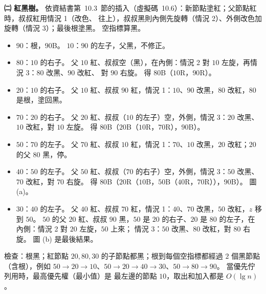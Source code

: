 \begin{pastsoln}
\textbf{㈡ 紅黑樹。} 依資結書第~10.3~節的插入（虛擬碼~10.6）：新節點塗紅；父節點紅時，叔叔紅用情況 1（改色、
往上），叔叔黑則內側先旋轉（情況 2）、外側改色加旋轉（情況 3）；最後根塗黑。 空指標算黑。
\begin{itemize}
\item $90$：根，$90$B。 $10$：$90$ 的左子，父黑，不修正。
\item $80$：$10$ 的右子。 父 $10$ 紅、叔叔空（黑），在內側：情況 2 對 $10$ 左旋，再情況 3：$80$ 改黑、$90$ 改紅、
對 $90$ 右旋。 得 $80$B（$10$R，$90$R）。
\item $20$：$10$ 的右子。 父 $10$ 紅、叔叔 $90$ 紅，情況 1：$10$、$90$ 改黑，$80$ 改紅，$80$ 是根，塗回黑。
\item $70$：$20$ 的右子。 父 $20$ 紅、叔叔（$10$ 的左子）空，外側，情況 3：$20$ 改黑、$10$ 改紅，對 $10$ 左旋。
得 $80$B（$20$B（$10$R，$70$R），$90$B）。
\item $50$：$70$ 的左子。 父 $70$ 紅、叔叔 $10$ 紅，情況 1：$70$、$10$ 改黑，$20$ 改紅；$20$ 的父 $80$ 黑，停。
\item $40$：$50$ 的左子。 父 $50$ 紅、叔叔（$70$ 的右子）空，外側，情況 3：$50$ 改黑、$70$ 改紅，對 $70$ 右旋。
得 $80$B（$20$R（$10$B，$50$B（$40$R，$70$R）），$90$B）。 圖 (a)。
\item $30$：$40$ 的左子。 父 $40$ 紅、叔叔 $70$ 紅，情況 1：$40$、$70$ 改黑，$50$ 改紅，$z$ 移到 $50$。 $50$ 的父
$20$ 紅、叔叔 $90$ 黑，$50$ 是 $20$ 的右子、$20$ 是 $80$ 的左子，在內側：情況 2 對 $20$ 左旋，$50$ 上來；
情況 3：$50$ 改黑、$80$ 改紅，對 $80$ 右旋。 圖 (b) 是最後結果。
\end{itemize}
\begin{center}
\end{center}
檢查：根黑；紅節點 $20, 80, 30$ 的子節點都黑；根到每個空指標都經過 $2$ 個黑節點（含根），例如
$50 \to 20 \to 10$、$50 \to 20 \to 40 \to 30$、$50 \to 80 \to 90$。 當優先佇列用時，最高優先權（最小值）是
最左邊的節點 $10$，取出和加入都是 $O(\lg n)$。


\end{pastsoln}
